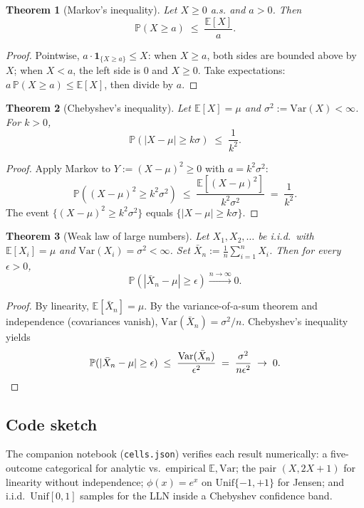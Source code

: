 \documentclass[11pt]{article}
\newtheorem{theorem}{Theorem}[section]
\theoremstyle{remark}
\begin{document}
\begin{theorem}[Markov's inequality]
Let $X \ge 0$ a.s. and $a > 0$. Then
\[
\mathbb{P}(X \ge a) \;\le\; \frac{\mathbb{E}[X]}{a}.
\]
\end{theorem}

\begin{proof}
Pointwise, $a\cdot \mathbf{1}_{\{X\ge a\}} \le X$: when $X \ge a$, both sides are bounded above by $X$; when $X < a$, the left side is $0$ and $X \ge 0$. Take expectations: $a\,\mathbb{P}(X\ge a) \le \mathbb{E}[X]$, then divide by $a$.
\end{proof}

\begin{theorem}[Chebyshev's inequality]
Let $\mathbb{E}[X] = \mu$ and $\sigma^2 := \mathrm{Var}(X) < \infty$. For $k > 0$,
\[
\mathbb{P}(|X - \mu| \ge k\sigma) \;\le\; \frac{1}{k^2}.
\]
\end{theorem}

\begin{proof}
Apply Markov to $Y := (X - \mu)^2 \ge 0$ with $a = k^2\sigma^2$:
\[
\mathbb{P}((X-\mu)^2 \ge k^2\sigma^2) \;\le\; \frac{\mathbb{E}[(X-\mu)^2]}{k^2\sigma^2} \;=\; \frac{1}{k^2}.
\]
The event $\{(X-\mu)^2 \ge k^2\sigma^2\}$ equals $\{|X-\mu| \ge k\sigma\}$.
\end{proof}

\begin{theorem}[Weak law of large numbers]
Let $X_1, X_2, \dots$ be i.i.d.\ with $\mathbb{E}[X_i] = \mu$ and $\mathrm{Var}(X_i) = \sigma^2 < \infty$. Set $\bar{X}_n := \frac{1}{n}\sum_{i=1}^n X_i$. Then for every $\epsilon > 0$,
\[
\mathbb{P}(|\bar{X}_n - \mu| \ge \epsilon) \xrightarrow{n\to\infty} 0.
\]
\end{theorem}

\begin{proof}
By linearity, $\mathbb{E}[\bar{X}_n] = \mu$. By the variance-of-a-sum theorem and independence (covariances vanish), $\mathrm{Var}(\bar{X}_n) = \sigma^2/n$. Chebyshev's inequality yields
\[
\mathbb{P}(|\bar{X}_n - \mu| \ge \epsilon) \;\le\; \frac{\mathrm{Var}(\bar{X}_n)}{\epsilon^2} \;=\; \frac{\sigma^2}{n\epsilon^2} \;\to\; 0. \qedhere
\]
\end{proof}

\subsection*{Code sketch}

The companion notebook (\texttt{cells.json}) verifies each result numerically: a five-outcome categorical for analytic vs.\ empirical $\mathbb{E},\mathrm{Var}$; the pair $(X, 2X+1)$ for linearity without independence; $\phi(x)=e^x$ on $\mathrm{Unif}\{-1,+1\}$ for Jensen; and i.i.d.\ $\mathrm{Unif}[0,1]$ samples for the LLN inside a Chebyshev confidence band.
\end{document}
